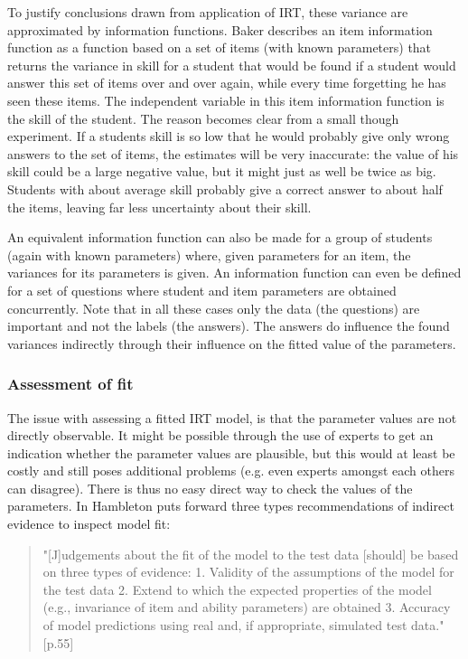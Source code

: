 \documentclass{scrartcl}
\begin{document}
To justify conclusions drawn from application of IRT, these variance are approximated by information functions. Baker \cite{basicbaker} describes an item information function as a function based on a set of items (with known parameters) that returns the variance in skill for a student that would be found if a student would answer this set of items over and over again, while every time forgetting he has seen these items. The independent variable in this item information function is the skill of the student. The reason becomes clear from a small though experiment. If a students skill is so low that he would probably give only wrong answers to the set of items, the estimates will be very inaccurate: the value of his skill could be a large negative value, but it might just as well be twice as big. Students with about average skill probably give a correct answer to about half the items, leaving far less uncertainty about their skill.

An equivalent information function can also be made for a group of students (again with known parameters) where, given parameters for an item, the variances for its parameters is given. An information function can even be defined for a set of questions where student and item parameters are obtained concurrently. Note that in all these cases only the data (the questions) are important and not the labels (the answers). The answers do influence the found variances indirectly through their influence on the fitted value of the parameters.



\subsubsection{Assessment of fit}
The issue with assessing a fitted IRT model, is that the parameter values are not directly observable. It might be possible through the use of experts to get an indication whether the parameter values are plausible, but this would at least be costly and still poses additional problems (e.g. even experts amongst each others can disagree). There is thus no easy direct way to check the values of the parameters. In \cite{hambleton} Hambleton puts forward three types recommendations of indirect evidence to inspect model fit:

\begin{quote}"[J]udgements about the fit of the model to the test data [should] be based on three types of evidence: 1. Validity of the assumptions of the model for the test data 2. Extend to which the expected properties of the model (e.g., invariance of item and ability parameters) are obtained 3. Accuracy of model predictions using real and, if appropriate, simulated test data."[p.55]
\end{quote}
\end{document}
